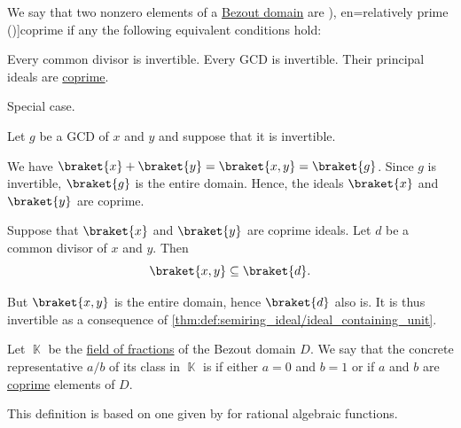 \begin{definition}\label{def:coprime_elements}\mimprovised
  We say that two nonzero elements of a \hyperref[def:bezout_domain]{Bezout domain} are \term[ru=взаимно простые (идеалы) (\cite[120]{Винберг2014КурсАлгебры}), en=relatively prime (\cite[113]{Lang2002Algebra})]{coprime} if any the following equivalent conditions hold:
  \begin{thmenum}
     Every common divisor is invertible.
     Every GCD is invertible.
     Their principal ideals are \hyperref[def:semiring_ideal/coprime]{coprime}.
  \end{thmenum}
\end{definition}
\begin{defproof}
   Special case.

   Let \( g \) be a GCD of \( x \) and \( y \) and suppose that it is invertible.

  We have \( \braket{ x } + \braket{ y } = \braket{ x, y } = \braket{ g } \). Since \( g \) is invertible, \( \braket{ g } \) is the entire domain. Hence, the ideals \( \braket{ x } \) and \( \braket{ y } \) are coprime.

   Suppose that \( \braket{ x } \) and \( \braket{ y } \) are coprime ideals. Let \( d \) be a common divisor of \( x \) and \( y \). Then
  \begin{equation*}
    \braket{ x, y } \subseteq \braket{ d }.
  \end{equation*}

  But \( \braket{ x, y } \) is the entire domain, hence \( \braket{ d } \) also is. It is thus invertible as a consequence of \cref{thm:def:semiring_ideal/ideal_containing_unit}.
\end{defproof}

\begin{definition}\label{def:lowest_terms}\mimprovised
  Let \( \BbbK \) be the \hyperref[def:field_of_fractions]{field of fractions} of the Bezout domain \( D \). We say that the concrete representative \( a / b \) of its class in \( \BbbK \) is  if either \( a = 0 \) and \( b = 1 \) or if \( a \) and \( b \) are \hyperref[def:coprime_elements]{coprime} elements of \( D \).
\end{definition}
\begin{comments}
  \item This definition is based on one given by \textcite[69]{Rotman2015AdvancedModernAlgebraPart1} for rational algebraic functions.
\end{comments}

